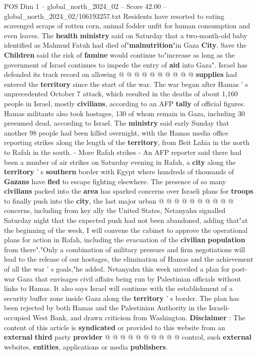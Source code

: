 \begin{textsample}{POS Dim 1 – global\_north\_2024\_02 – Score 42.00 – global\_north\_2024\_02/106193257.txt}
Residents have resorted to eating scavenged scraps of rotten corn, animal fodder unfit for human consumption and even leaves.
The \textbf{health} \textbf{ministry} said on Saturday that a two-month-old baby identified as Mahmud Fatuh had died of"\textbf{malnutrition}"in Gaza \textbf{City}.
Save the \textbf{Children} said the risk of \textbf{famine} would continue to"increase as long as the government of Israel continues to impede the entry of \textbf{aid} into Gaza".
Israel has defended its track record on allowing @ @ @ @ @ @ @ @ @ @ \textbf{supplies} had entered the \textbf{territory} since the start of the war.
The war began after Hamas ' s unprecedented October 7 attack, which resulted in the deaths of about 1,160 people in Israel, mostly \textbf{civilians}, according to an AFP \textbf{tally} of official figures.
Hamas militants also took hostages, 130 of whom remain in Gaza, including 30 presumed dead, according to Israel.
The \textbf{ministry} said early Sunday that another 98 people had been killed overnight, with the Hamas media office reporting strikes along the length of the \textbf{territory}, from Beit Lahia in the north to Rafah in the south. - More Rafah strikes - An AFP reporter said there had been a number of air strikes on Saturday evening in Rafah, a \textbf{city} along the \textbf{territory} ' s \textbf{southern} border with Egypt where hundreds of thousands of \textbf{Gazans} have \textbf{fled} to escape fighting elsewhere.
The presence of so many \textbf{civilians} packed into the \textbf{area} has sparked concerns over Israeli plans for \textbf{troops} to finally push into the \textbf{city}, the last major urban @ @ @ @ @ @ @ @ @ @ concerns, including from key ally the United States, Netanyahu signalled Saturday night that the expected push had not been abandoned, adding that"at the beginning of the week, I will convene the cabinet to approve the operational plans for action in Rafah, including the evacuation of the \textbf{civilian} \textbf{population} from there"."Only a combination of military pressure and firm negotiations will lead to the release of our hostages, the elimination of Hamas and the achievement of all the war ' s goals,"he added.
Netanyahu this week unveiled a plan for post-war Gaza that envisages civil affairs being run by Palestinian officials without links to Hamas.
It also says Israel will continue with the establishment of a security buffer zone inside Gaza along the \textbf{territory} ' s border.
The plan has been rejected by both Hamas and the Palestinian Authority in the Israeli-occupied West Bank, and drawn criticism from Washington. \textbf{Disclaimer} : The content of this article is \textbf{syndicated} or provided to this website from an \textbf{external} \textbf{third} party \textbf{provider} @ @ @ @ @ @ @ @ @ @ control, such \textbf{external} websites, \textbf{entities}, applications or media \textbf{publishers}.

\end{textsample}

